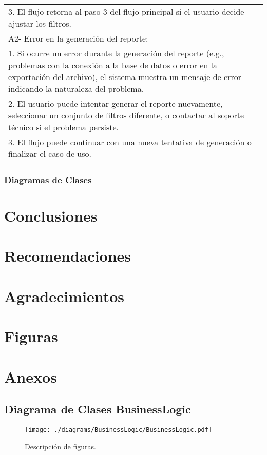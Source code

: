 \documentclass[stu, 12pt, letterpaper, donotrepeattitle, floatsintext, natbib]{apa7}
\begin{document}
\begin{longtable}{@{} p{16.5cm} @{}}
    \hspace{1cm}3. El flujo retorna al paso 3 del flujo principal si el usuario decide ajustar los filtros.                                                                                                                                                                      \\
    A2- Error en la generaci\'on del reporte:                                                                                                                                                                                                                                    \\
    \hspace{1cm}1. Si ocurre un error durante la generaci\'on del reporte (e.g., problemas con la conexi\'on a la base de datos o error en la exportaci\'on del archivo), el sistema muestra un mensaje de error indicando la naturaleza del problema.                           \\
    \hspace{1cm}2. El usuario puede intentar generar el reporte nuevamente, seleccionar un conjunto de filtros diferente, o contactar al soporte t\'ecnico si el problema persiste.                                                                                              \\
    \hspace{1cm}3. El flujo puede continuar con una nueva tentativa de generaci\'on o finalizar el caso de uso.                                                                                                                                                                  \\ \bottomrule
\end{longtable}
\subsubsection{Diagramas de Clases}


\newpage
\section{Conclusiones}
\newpage
\section{Recomendaciones}
\newpage
\section{Agradecimientos}
\newpage

\newpage
\section{Figuras}

\newpage
\section{Anexos}
\subsection{Diagrama de Clases BusinessLogic}
\begin{figure}
    \centering
    \caption{Descripci\'on de figuras.}
    \texttt{[image: ./diagrams/BusinessLogic/BusinessLogic.pdf]}
\end{figure}
\end{document}
